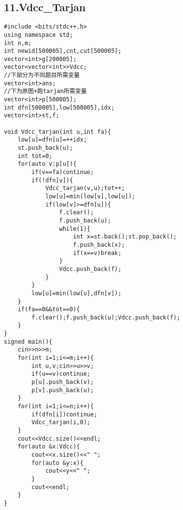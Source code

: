 \documentclass[]{article}
\begin{document}
\hypertarget{vdcc_tarjan}{%
\subsection{11.Vdcc\_Tarjan}\label{vdcc_tarjan}}

\begin{verbatim}
#include <bits/stdc++.h>
using namespace std;
int n,m;
int newid[500005],cnt,cut[500005];
vector<int>g[200005];
vector<vector<int>>Vdcc;
//下部分为不同题目所需变量
vector<int>ans;
//下为原图+跑tarjan所需变量
vector<int>p[500005];
int dfn[500005],low[500005],idx;
vector<int>st,f;

void Vdcc_tarjan(int u,int fa){
    low[u]=dfn[u]=++idx;
    st.push_back(u);
    int tot=0;
    for(auto v:p[u]){
        if(v==fa)continue;
        if(!dfn[v]){
            Vdcc_tarjan(v,u);tot++;
            low[u]=min(low[v],low[u]);
            if(low[v]>=dfn[u]){
                f.clear();
                f.push_back(u);
                while(1){
                    int x=st.back();st.pop_back();
                    f.push_back(x);
                    if(x==v)break;
                }
                Vdcc.push_back(f);
            }
        }
        low[u]=min(low[u],dfn[v]);
    }
    if(fa==0&&tot==0){
        f.clear();f.push_back(u);Vdcc.push_back(f);
    }
}
signed main(){
    cin>>n>>m;
    for(int i=1;i<=m;i++){
        int u,v;cin>>u>>v;
        if(u==v)continue;
        p[u].push_back(v);
        p[v].push_back(u);
    }
    for(int i=1;i<=n;i++){
        if(dfn[i])continue;
        Vdcc_tarjan(i,0);
    }
    cout<<Vdcc.size()<<endl;
    for(auto &x:Vdcc){
        cout<<x.size()<<" ";
        for(auto &y:x){
            cout<<y<<" ";
        }
        cout<<endl;
    }
}
\end{verbatim}
\end{document}
